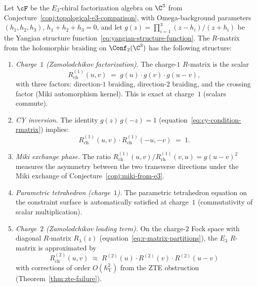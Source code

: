 \begin{conjecture}
\label{conj:chiral-rmatrix-e3-braiding}
\ClaimStatusConjectured
Let $\cF$ be the $E_3$-chiral factorization algebra on $\C^3$ from Conjecture~\ref{conj:topological-e3-comparison}, with Omega-background parameters $(h_1, h_2, h_3)$, $h_1 + h_2 + h_3 = 0$, and let $g(z) = \prod_{i=1}^{3} (z - h_i)/(z + h_i)$ be the Yangian structure function~\eqref{eq:yangian-structure-function}. The $R$-matrix from the holomorphic braiding on $\Conf_2(\C^3)$ has the following structure:

\begin{enumerate}[label=\textup{(\alph*)}]
 \item \emph{Charge~$1$ (Zamolodchikov factorization).} The charge-$1$ $R$-matrix is the scalar
 \[
 R_{\mathrm{ch}}^{(1)}(u, v) \;=\; g(u) \cdot g(v) \cdot g(u - v),
 \]
 with three factors: direction-$1$ braiding, direction-$2$ braiding, and the crossing factor (Miki automorphism kernel). This is exact at charge~$1$ (scalars commute).

 \item \emph{CY inversion.} The identity $g(z)\,g(-z) = 1$ (equation~\eqref{eq:cy-condition-rmatrix}) implies:
 \[
 R_{\mathrm{ch}}^{(1)}(u, v) \cdot R_{\mathrm{ch}}^{(1)}(-u, -v) \;=\; 1.
 \]

 \item \emph{Miki exchange phase.} The ratio $R_{\mathrm{ch}}^{(1)}(u,v) / R_{\mathrm{ch}}^{(1)}(v,u) = g(u-v)^2$ measures the asymmetry between the two transverse directions under the Miki exchange of Conjecture~\ref{conj:miki-from-e3}.

 \item \emph{Parametric tetrahedron (charge~$1$).} The parametric tetrahedron equation on the constraint surface is automatically satisfied at charge~$1$ (commutativity of scalar multiplication).

 \item \emph{Charge~$2$ (Zamolodchikov leading term).} On the charge-$2$ Fock space with diagonal $R$-matrix $R_\lambda(z)$ (equation~\eqref{eq:r-matrix-partitions}), the $E_3$ $R$-matrix is approximated by
 \[
 R_{\mathrm{ch}}^{(2)}(u,v) \;\approx\; R^{(2)}(u) \cdot R^{(2)}(v) \cdot R^{(2)}(u-v)
 \]
 with corrections of order $O(\hbar_{\mathrm{Y}}^2)$ from the ZTE obstruction (Theorem~\ref{thm:zte-failure}).


\end{enumerate}
\end{conjecture}
